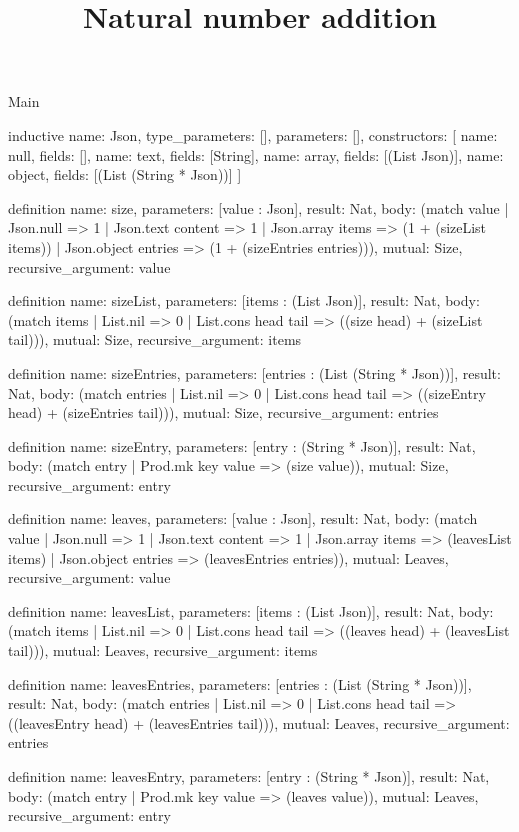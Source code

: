 \begin{lexlean}{Main}
\title{Natural number addition}
\begin{semanticmodule}
inductive{
  name: Json,
  type_parameters: [],
  parameters: [],
  constructors: [
    {name: null, fields: []},
    {name: text, fields: [String]},
    {name: array, fields: [(List Json)]},
    {name: object, fields: [(List (String * Json))]}
  ]
}

definition{
  name: size,
  parameters: [value : Json],
  result: Nat,
  body: (match value
    | Json.null => 1
    | Json.text content => 1
    | Json.array items => (1 + (sizeList items))
    | Json.object entries => (1 + (sizeEntries entries))),
  mutual: Size,
  recursive_argument: value
}

definition{
  name: sizeList,
  parameters: [items : (List Json)],
  result: Nat,
  body: (match items | List.nil => 0 | List.cons head tail => ((size head) + (sizeList tail))),
  mutual: Size,
  recursive_argument: items
}

definition{
  name: sizeEntries,
  parameters: [entries : (List (String * Json))],
  result: Nat,
  body: (match entries
    | List.nil => 0
    | List.cons head tail => ((sizeEntry head) + (sizeEntries tail))),
  mutual: Size,
  recursive_argument: entries
}

definition{
  name: sizeEntry,
  parameters: [entry : (String * Json)],
  result: Nat,
  body: (match entry | Prod.mk key value => (size value)),
  mutual: Size,
  recursive_argument: entry
}

definition{
  name: leaves,
  parameters: [value : Json],
  result: Nat,
  body: (match value
    | Json.null => 1
    | Json.text content => 1
    | Json.array items => (leavesList items)
    | Json.object entries => (leavesEntries entries)),
  mutual: Leaves,
  recursive_argument: value
}

definition{
  name: leavesList,
  parameters: [items : (List Json)],
  result: Nat,
  body: (match items | List.nil => 0 | List.cons head tail => ((leaves head) + (leavesList tail))),
  mutual: Leaves,
  recursive_argument: items
}

definition{
  name: leavesEntries,
  parameters: [entries : (List (String * Json))],
  result: Nat,
  body: (match entries
    | List.nil => 0
    | List.cons head tail => ((leavesEntry head) + (leavesEntries tail))),
  mutual: Leaves,
  recursive_argument: entries
}

definition{
  name: leavesEntry,
  parameters: [entry : (String * Json)],
  result: Nat,
  body: (match entry | Prod.mk key value => (leaves value)),
  mutual: Leaves,
  recursive_argument: entry
}


\end{semanticmodule}
\end{lexlean}

